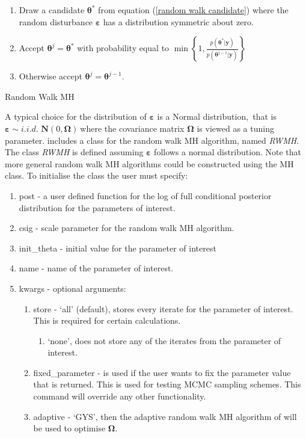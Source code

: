\documentclass[article]{jss}
\begin{document}
%
\begin{algorithm}[H]
  \begin{enumerate}
  \item Draw a candidate $\bm{\theta}^{\ast}$ from equation
    (\ref{random walk candidate}) where the random disturbance
    $\bm{\varepsilon}$ has a distribution symmetric about zero.
  \item Accept $\bm{\theta}^{j}=\bm{\theta}^{\ast}$ with probability
    equal to $\min\left\{
      1,\frac{p\left(\bm{\theta}^{\ast}|\bm{y}\right)}{p\left(\bm{\theta}^{j-1}|\bm{y}\right)}\right\}
    $
  \item Otherwise accept $\bm{\theta}^{j}=\bm{\theta}^{j-1}.$
  \end{enumerate}
  \caption{Random Walk MH}
\label{alg:rwmh}
\end{algorithm}


A typical choice for the distribution of $\bm{\bm{\varepsilon}}$ is a
Normal distribution,\emph{\ }that is $\bm{\varepsilon\sim}i.i.d.$
$\bm{N}\left(0,\bm{\Omega}\right)\ $where the covariance matrix
$\bm{\Omega}$ is viewed as a tuning parameter.  includes a
class for the random walk MH algorithm, named \emph{RWMH}. The class
\emph{RWMH} is defined assuming $\bm{\varepsilon}$ follows a normal
distribution. Note that more general random walk MH algorithms could
be constructed using the MH class. To initialise the class the user
must specify:
\begin{enumerate}
\item post - a user defined function for the log of full conditional
  posterior distribution for the parameters of interest.
\item csig - scale parameter for the random walk MH algorithm.
\item init\_theta - initial value for the parameter of interest
\item name - name of the parameter of interest.
\item kwargs - optional arguments:

  \begin{enumerate}
  \item store - `all' (default), stores every iterate for the
    parameter of interest. This is required for certain calculations.

\begin{enumerate}
\item `none', does not store any of the iterates from the parameter of
  interest.
\end{enumerate}
\item fixed\_parameter - is used if the user wants to fix the
  parameter value that is returned. This is used for testing MCMC
  sampling schemes.  This command will override any other
  functionality.
\item adaptive - `GYS', then the adaptive random walk MH algorithm of
  \citet{GarthwaiteYanScisson2010} will be used to optimise
  $\bm{\Omega}.$
\end{enumerate}
\end{enumerate}
\end{document}
